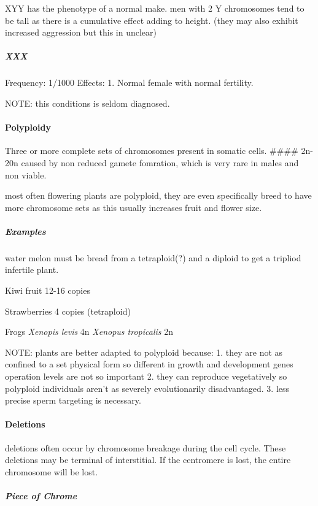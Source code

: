 \documentclass[]{article}
\let\oldparagraph\paragraph
\renewcommand{\paragraph}[1]{\oldparagraph{#1}\mbox{}}
\let\oldsubparagraph\subparagraph
\renewcommand{\subparagraph}[1]{\oldsubparagraph{#1}\mbox{}}
\begin{document}
XYY has the phenotype of a normal make. men with 2 Y chromosomes tend to
be tall as there is a cumulative effect adding to height. (they may also
exhibit increased aggression but this in unclear)

\hypertarget{xxx}{%
\subparagraph{XXX}\label{xxx}}

Frequency: 1/1000 Effects: 1. Normal female with normal fertility.

NOTE: this conditions is seldom diagnosed.

\hypertarget{polyploidy-1}{%
\paragraph{Polyploidy}\label{polyploidy-1}}

Three or more complete sets of chromosomes present in somatic cells.
\#\#\#\# 2n-20n caused by non reduced gamete fomration, which is very
rare in males and non viable.

most often flowering plants are polyploid, they are even specifically
breed to have more chromosome sets as this usually increases fruit and
flower size.

\hypertarget{examples-2}{%
\subparagraph{Examples}\label{examples-2}}

water melon must be bread from a tetraploid(?) and a diploid to get a
tripliod infertile plant.

Kiwi fruit 12-16 copies

Strawberries 4 copies (tetraploid)

Frogs \emph{Xenopis levis} 4n \emph{Xenopus tropicalis} 2n

NOTE: plants are better adapted to polyploid because: 1. they are not as
confined to a set physical form so different in growth and development
genes operation levels are not so important 2. they can reproduce
vegetatively so polyploid individuals aren't as severely evolutionarily
disadvantaged. 3. less precise sperm targeting is necessary.

\hypertarget{deletions}{%
\paragraph{Deletions}\label{deletions}}

deletions often occur by chromosome breakage during the cell cycle.
These deletions may be terminal of interstitial. If the centromere is
lost, the entire chromosome will be lost.

\hypertarget{piece-of-chrome}{%
\subparagraph{Piece of Chrome}\label{piece-of-chrome}}
\end{document}
